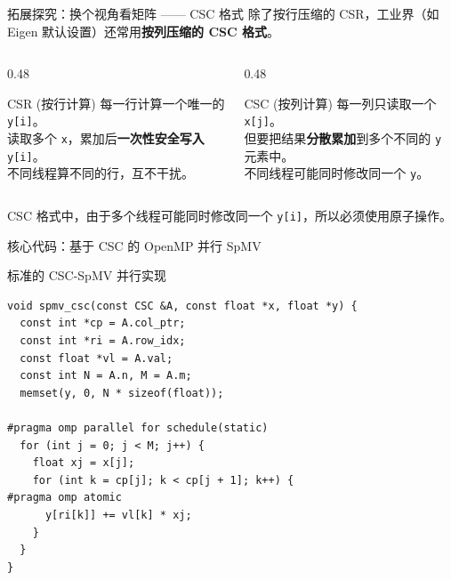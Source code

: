 \documentclass{beamer}
\begin{document}
\begin{frame}{拓展探究：换个视角看矩阵 —— CSC 格式}
	除了按行压缩的 CSR，工业界（如 Eigen 默认设置）还常用\textbf{按列压缩的 CSC 格式}。
	\vskip 0.3cm
	
	\begin{columns}
		\begin{column}{0.48\textwidth}
			\begin{block}{CSR (按行计算)}
				\small
				每一行计算一个唯一的 \texttt{y[i]}。\\
				读取多个 \texttt{x}，累加后\textbf{一次性安全写入} \texttt{y[i]}。\\
				不同线程算不同的行，互不干扰。
			\end{block}
		\end{column}
		
		\begin{column}{0.48\textwidth}
			\begin{block}{CSC (按列计算)}
				\small
				每一列只读取一个 \texttt{x[j]}。\\
				但要把结果\textbf{分散累加}到多个不同的 \texttt{y} 元素中。\\
				不同线程可能同时修改同一个 \texttt{y}。
			\end{block}
		\end{column}
	\end{columns}
	
	\vskip 0.4cm
	
	CSC 格式中，由于多个线程可能同时修改同一个 \texttt{y[i]}，所以必须使用原子操作。
\end{frame}

\begin{frame}[fragile]{核心代码：基于 CSC 的 OpenMP 并行 SpMV}
	
	\begin{block}{标准的 CSC-SpMV 并行实现}
		\vspace{-0.2cm} %
		\begin{lstlisting}
void spmv_csc(const CSC &A, const float *x, float *y) {
  const int *cp = A.col_ptr;
  const int *ri = A.row_idx;
  const float *vl = A.val;
  const int N = A.n, M = A.m;
  memset(y, 0, N * sizeof(float));
  
#pragma omp parallel for schedule(static)
  for (int j = 0; j < M; j++) {
    float xj = x[j];
    for (int k = cp[j]; k < cp[j + 1]; k++) {
#pragma omp atomic
      y[ri[k]] += vl[k] * xj;
    }
  }
}
		\end{lstlisting}
	\end{block}
\end{frame}
\end{document}
